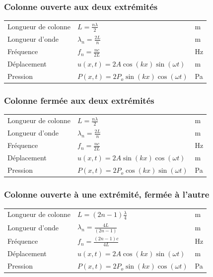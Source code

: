 \subsubsection{Colonne ouverte aux deux extrémités}

\begin{tabular}{lll}
Longueur de colonne & \(L=\frac{n\lambda}{2}\) & \si{\meter}\\[8pt]
Longueur d'onde & \(\lambda_{n}=\frac{2L}{n}\) & \si{\meter}\\[8pt]
Fréquence & \(f_{n}=\frac{nc}{2L}\) & \si{\hertz}\\[8pt]
Déplacement & \(u(x,t)=2A\cos(kx)\sin(\omega t)\) & \si{\meter}\\[5pt]
Pression & \(P(x,t)=2P_{o}\sin(kx)\cos(\omega t)\) & \si{\pascal}
\end{tabular}

\subsubsection{Colonne fermée aux deux extrémités}
\begin{tabular}{lll}
Longueur de colonne & \(L=\frac{n\lambda}{2}\) & \si{\meter}\\[8pt]
Longueur d'onde & \(\lambda_{n}=\frac{2L}{n}\) & \si{\meter}\\[8pt]
Fréquence & \(f_{n}=\frac{nc}{2L}\) & \si{\hertz}\\[8pt]
Déplacement & \(u(x,t)=2A\sin(kx)\cos(\omega t)\) & \si{\meter}\\[5pt]
Pression & \(P(x,t)=2P_{o}\cos(kx)\sin(\omega t)\) & \si{\pascal}
\end{tabular}

\subsubsection{Colonne ouverte à une extrémité, fermée à l'autre}
\begin{tabular}{lll}
Longueur de colonne & \(L=(2n-1)\frac{\lambda}{4}\) & \si{\meter}\\
Longueur d'onde & \(\lambda_{n}=\frac{4L}{(2n-1)}\) & \si{\meter}\\[8pt]
Fréquence & \(f_{n}=\frac{(2n-1)c}{4L}\) & \si{\hertz}\\[8pt]
Déplacement & \(u(x,t)=2A\cos(kx)\sin(\omega t)\) & \si{\meter}\\[5pt]
Pression & \(P(x,t)=2P_{o}\sin(kx)\cos(\omega t)\) & \si{\pascal}
\end{tabular}

